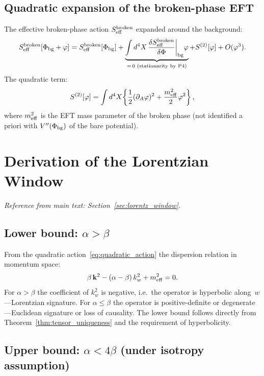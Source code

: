 \documentclass[11pt,a4paper]{article}
\numberwithin{equation}{section}
\begin{document}
\subsection*{Quadratic expansion of the broken-phase EFT}

The effective broken-phase action $S_{\rm eff}^{\rm broken}$
expanded around the background:
\begin{equation}
  S_{\rm eff}^{\rm broken}[\Phi_{\rm bg}+\varphi]
  = S_{\rm eff}^{\rm broken}[\Phi_{\rm bg}]
  + \underbrace{\int d^4X\,
    \frac{\delta S_{\rm eff}^{\rm broken}}{\delta\Phi}
    \bigg|_{\rm bg}\varphi}_{=\,0\text{ (stationarity by P4)}}
  + S^{(2)}[\varphi]+O(\varphi^3).
\end{equation}
The quadratic term:
\begin{equation}
  S^{(2)}[\varphi] = \int d^4X\!\left\{
    \frac{1}{2}(\partial_A\varphi)^2 + \frac{m_{\rm eff}^2}{2}\varphi^2
  \right\},
\end{equation}
where $m_{\rm eff}^2$ is the EFT mass parameter of the broken phase
(not identified a priori with $V''(\Phi_{\rm bg})$ of the bare potential).

\section{Derivation of the Lorentzian Window}
\label{app:lorentz_window}

\textit{Reference from main text: Section~\ref{sec:lorentz_window}.}

\subsection*{Lower bound: $\alpha>\beta$}

From the quadratic action~\eqref{eq:quadratic_action}
the dispersion relation in momentum space:
\[
  \beta\,\mathbf{k}^2 - (\alpha-\beta)\,k_w^2 + m_{\rm eff}^2 = 0.
\]
For $\alpha>\beta$ the coefficient of $k_w^2$ is negative, i.e.\
the operator is hyperbolic along~$w$---Lorentzian signature.
For $\alpha\leq\beta$ the operator is positive-definite or degenerate---Euclidean
signature or loss of causality.
The lower bound follows directly from Theorem~\ref{thm:tensor_uniqueness}
and the requirement of hyperbolicity.

\subsection*{Upper bound: $\alpha<4\beta$ (under isotropy assumption)}
\end{document}
